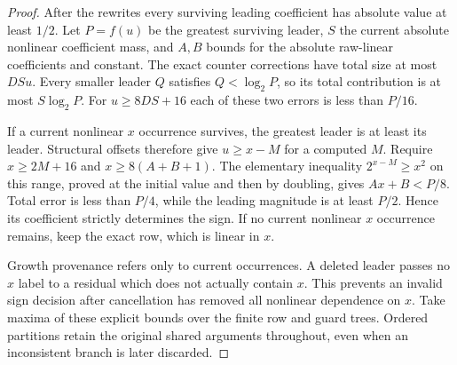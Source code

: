 \begin{proof}
After the rewrites every surviving leading coefficient has absolute value
at least $1/2$. Let $P=f(u)$ be the greatest surviving leader, $S$ the
current absolute nonlinear coefficient mass, and $A,B$ bounds for the
absolute raw-linear coefficients and constant. The exact counter
corrections have total size at most $DSu$. Every smaller leader $Q$
satisfies $Q<\log_2 P$, so its total contribution is at most
$S\log_2P$. For $u\ge8DS+16$ each of these two errors is less than $P/16$.

If a current nonlinear $x$ occurrence survives, the greatest leader is
at least its leader. Structural offsets therefore give $u\ge x-M$ for a
computed $M$. Require $x\ge2M+16$ and $x\ge8(A+B+1)$. The elementary
inequality $2^{x-M}\ge x^2$ on this range, proved at the initial value
and then by doubling, gives $Ax+B<P/8$. Total error is less than $P/4$,
while the leading magnitude is at least $P/2$. Hence its coefficient
strictly determines the sign. If no current nonlinear $x$ occurrence
remains, keep the exact row, which is linear in $x$.

Growth provenance refers only to current occurrences. A deleted leader
passes no $x$ label to a residual which does not actually contain $x$.
This prevents an invalid sign decision after cancellation has removed all
nonlinear dependence on $x$. Take maxima of these explicit bounds over the
finite row and guard trees. Ordered partitions retain the original shared
arguments throughout, even when an inconsistent branch is later discarded.
\end{proof}

